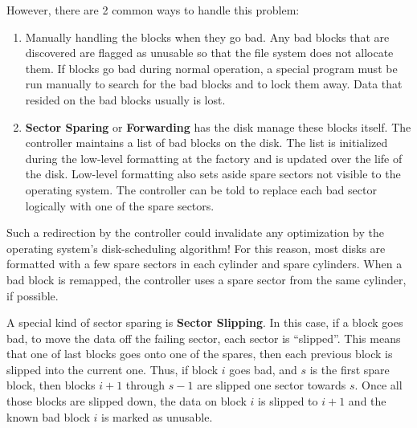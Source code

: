 However, there are 2 common ways to handle this problem:
\begin{enumerate}[noitemsep]
\item Manually handling the blocks when they go bad.
  Any bad blocks that are discovered are flagged as unusable so that the file system does not allocate them.
  If blocks go bad during normal operation, a special program must be run manually to search for the bad blocks and to lock them away.
  Data that resided on the bad blocks usually is lost.

\item \textbf{Sector Sparing} or \textbf{Forwarding} has the disk manage these blocks itself.
  The controller maintains a list of bad blocks on the disk.
  The list is initialized during the low-level formatting at the factory and is updated over the life of the disk.
  Low-level formatting also sets aside spare sectors not visible to the operating system.
  The controller can be told to replace each bad sector logically with one of the spare sectors.
\end{enumerate}

Such a redirection by the controller could invalidate any optimization by the operating system’s disk-scheduling algorithm!
For this reason, most disks are formatted with a few spare sectors in each cylinder and spare cylinders.
When a bad block is remapped, the controller uses a spare sector from the same cylinder, if possible.

A special kind of sector sparing is \textbf{Sector Slipping}.
In this case, if a block goes bad, to move the data off the failing sector, each sector is ``slipped''.
This means that one of last blocks goes onto one of the spares, then each previous block is slipped into the current one.
Thus, if block $i$ goes bad, and $s$ is the first spare block, then blocks $i+1$ through $s-1$ are slipped one sector towards $s$.
Once all those blocks are slipped down, the data on block $i$ is slipped to $i+1$ and the known bad block $i$ is marked as unusable.

